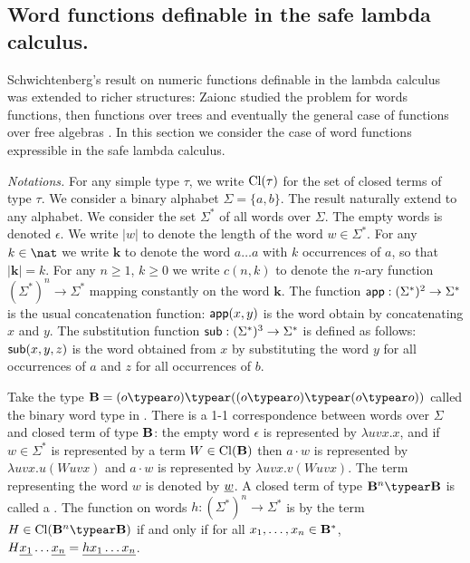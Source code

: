 \newcommand\wordnum[1]{\mathbf{#1}} %
\newcommand\safedefset{$\lambda^{safe}${\rm def}}

\newcommand\fatlambda{\lambda\kern-0.7em\lambda}
\newcommand\wordapp{{\sf app}}
\newcommand\wordsub{{\sf sub}}


\subsection{Word functions definable in the safe lambda calculus.}
Schwichtenberg's result on numeric functions definable in the lambda
calculus was extended to richer structures: Zaionc studied the
problem for words functions, then functions over trees and
eventually the general case of functions over free algebras
\cite{DBLP:journals/tcs/Leivant93,DBLP:journals/apal/Zaionc91,702481,DBLP:journals/tcs/Zaionc87,
zaionc:csl94}. In this section we consider the case of word
functions expressible in the safe lambda calculus.
\smallskip

\emph{Notations.} For any simple type $\tau$, we write
${\rm Cl}(\tau)$ for the set of closed terms of type $\tau$. We
consider a binary alphabet $\Sigma = \{a,b\}$. The result naturally
extend to any alphabet. We consider the set $\Sigma^*$ of all words
over $\Sigma$. The empty words is denoted $\epsilon$. We write $|w|$
to denote the length of the word $w\in\Sigma^*$. For any $k\in \nat$
we write $\wordnum{k}$ to denote the word $a \ldots a$ with $k$
occurrences of $a$, so that $|\wordnum{k}| = k$. For any $n\geq 1$,
$k\geq 0$ we write $c(n,k)$ to denote the $n$-ary function
$(\Sigma^*)^n \rightarrow \Sigma^*$ mapping constantly on the word
$\wordnum{k}$. The function $\wordapp : (\Sigma^*)^2 \rightarrow
\Sigma^*$ is the usual concatenation function: $\wordapp(x,y)$ is
the word obtain by concatenating $x$ and $y$. The substitution
function $\wordsub : (\Sigma^*)^3 \rightarrow \Sigma^*$ is defined
as follows: $\wordsub(x,y,z)$ is the word obtained from $x$ by
substituting the word $y$ for all occurrences of $a$ and $z$ for all
occurrences of $b$.

Take the type $\zaiwordtyp = (o\typear o)\typear ((o\typear
o)\typear (o\typear o))$ called the binary word type in
\cite{DBLP:journals/tcs/Zaionc87}. There is a 1-1 correspondence
between words over $\Sigma$ and closed term of type $\mathbf{B}$:
the empty word $\epsilon$ is represented by $\lambda u v x.x$, and
if $w\in \Sigma^*$ is represented by a term $W \in
{\rm Cl}(\mathbf{B})$ then $a \cdot w$ is represented by $\lambda
u v x. u(W uvx)$ and $a \cdot w$ is represented by $\lambda u v x.
v(W uvx)$. The term representing the word $w$ is denoted by
$\underline{w}$. A closed term of type $\zaiwordtyp^n \typear
\zaiwordtyp$ is called a . The function on words $h:(\Sigma^*)^n \rightarrow
\Sigma^*$ is  by the term $H \in
\closedof{\zaiwordtyp^n \typear \zaiwordtyp}$ if and only if for all
$x_1, \ldots, x_n \in \mathbf{B}^*$, $H \underline{x_1} \ldots
\underline{x_n} = \underline{h x_1 \ldots x_n}$. \bigskip

